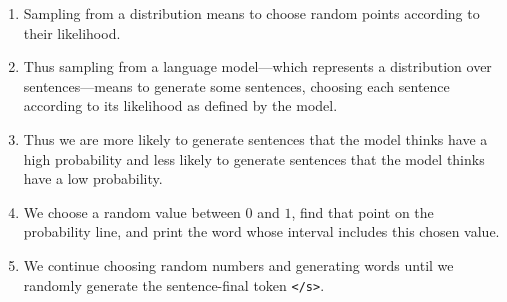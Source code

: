 \begin{enumerate}
    \item Sampling from a distribution means to choose random points according to their likelihood. 

    \item Thus sampling from a language model—which represents a distribution over sentences—means to generate some sentences, choosing each sentence according to its likelihood as defined by the model. 

    \item Thus we are more likely to generate sentences that the model thinks have a high probability and less likely to generate sentences that the model thinks have a low probability.

    \item We choose a random value between $0$ and $1$, find that point on the probability line, and print the word whose interval includes this chosen value. 

    \item We continue choosing random numbers and generating words until we randomly generate the sentence-final token \verb|</s>|.
\end{enumerate}






















